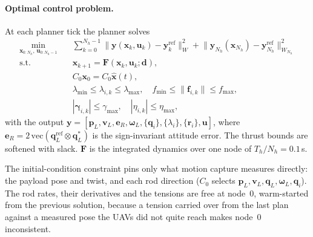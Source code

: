 \paragraph{Optimal control problem.} At each planner tick the planner solves
\begin{equation}
\begin{aligned}
    \min_{\mathbf{x}_{0:N_h},\, \mathbf{u}_{0:N_h-1}} \quad & \sum_{k=0}^{N_h-1} \big\| \mathbf{y}(\mathbf{x}_k, \mathbf{u}_k) - \mathbf{y}_k^{\mathrm{ref}} \big\|_{W}^{2}
    + \big\| \mathbf{y}_{N_h}(\mathbf{x}_{N_h}) - \mathbf{y}_{N_h}^{\mathrm{ref}} \big\|_{W_{N_h}}^{2} \\
    \text{s.t.} \quad & \mathbf{x}_{k+1} = \mathbf{F}(\mathbf{x}_k, \mathbf{u}_k; \mathbf{d}), \\
    & C_0 \mathbf{x}_0 = C_0 \hat{\mathbf{x}}(t), \\
    & \lambda_{\min} \le \lambda_{i,k} \le \lambda_{\max}, \quad f_{\min} \le \|\mathbf{f}_{i,k}\| \le f_{\max}, \\
    & |\boldsymbol{\gamma}_{i,k}| \le \gamma_{\max}, \quad |\eta_{i,k}| \le \eta_{\max},
\end{aligned}
\label{eq:plan_ocp}
\end{equation}
with the output
$\mathbf{y} = [\mathbf{p}_L, \mathbf{v}_L, \mathbf{e}_R, \boldsymbol{\omega}_L, \{\mathbf{q}_i\}, \{\lambda_i\}, \{\mathbf{r}_i\}, \mathbf{u}]$,
where $\mathbf{e}_R = 2\,\mathrm{vec}(\mathbf{q}_L^{\mathrm{ref}} \otimes \mathbf{q}_L^{*})$ is the sign-invariant
attitude error. The thrust bounds are softened with slack. $\mathbf{F}$ is the integrated dynamics
over one node of $T_h/N_h = 0.1$\,s.

The initial-condition constraint pins only what motion capture measures directly: the payload pose
and twist, and each rod direction ($C_0$ selects $\mathbf{p}_L, \mathbf{v}_L, \mathbf{q}_L,
\boldsymbol{\omega}_L, \mathbf{q}_i$). The rod rates, their derivatives and the tensions are free at
node~0, warm-started from the previous solution, because a tension carried over from the last plan
against a measured pose the UAVs did not quite reach makes node~0 inconsistent.

